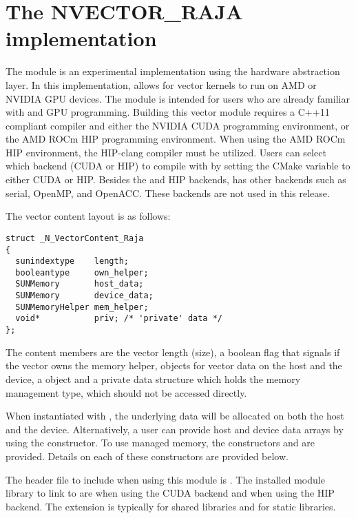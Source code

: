 \section{The NVECTOR\_RAJA implementation}\label{ss:nvec_raja}

The {\nvecraja} module is an experimental {\nvector} implementation using the
\href{https://software.llnl.gov/RAJA/}{\raja} hardware abstraction layer. In
this implementation, {\raja} allows for {\sundials} vector kernels to run on AMD
or NVIDIA GPU devices. The module is intended for users who are already familiar
with {\raja} and GPU programming. Building this vector module requires a C++11
compliant compiler and either the NVIDIA CUDA programming environment, or the
AMD ROCm HIP programming environment. When using the AMD ROCm HIP environment,
the HIP-clang compiler must be utilized. Users can select which backend (CUDA or
HIP) to compile with by setting the  CMake variable
to either CUDA or HIP. Besides the {\cuda} and HIP backends, {\raja} has other
backends such as serial, OpenMP, and OpenACC. These backends are not used in
this {\sundials} release.

The vector content layout is as follows:
\begin{verbatim}
struct _N_VectorContent_Raja
{
  sunindextype    length;
  booleantype     own_helper;
  SUNMemory       host_data;
  SUNMemory       device_data;
  SUNMemoryHelper mem_helper;
  void*           priv; /* 'private' data */
};
\end{verbatim}
The content members are the vector length (size), a boolean flag that signals if
the vector owns the memory helper,  objects for vector data on the
host and the device, a  object and a private data structure
which holds the memory management type, which should not be accessed directly.

When instantiated with , the underlying data will be allocated
on both the host and the device. Alternatively, a user can provide host
and device data arrays by using the  constructor. To use
managed memory, the constructors  and \newline
{} are provided. Details on each of these constructors
are provided below.


The header file to include when using this module is . The
installed module library to link to are
 when using the CUDA backend and
 when using the HIP backend. The
extension  is typically  for shared libraries and
 for static libraries.

